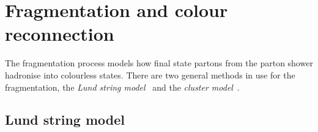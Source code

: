 
\section{Fragmentation and colour reconnection} %
\label{sec:fragmentation_and_colour_reconnection}

The fragmentation process models how final state partons from the parton shower hadronise into colourless states.
There are two general methods in use for the fragmentation, the \textit{Lund string model}~\cite{Gen:LundString1,Gen:Pyth8p2} and the \textit{cluster model}~\cite{Gen:Herwigpp}.

\subsection{Lund string model} %
\label{sub:string_fragmentation}

